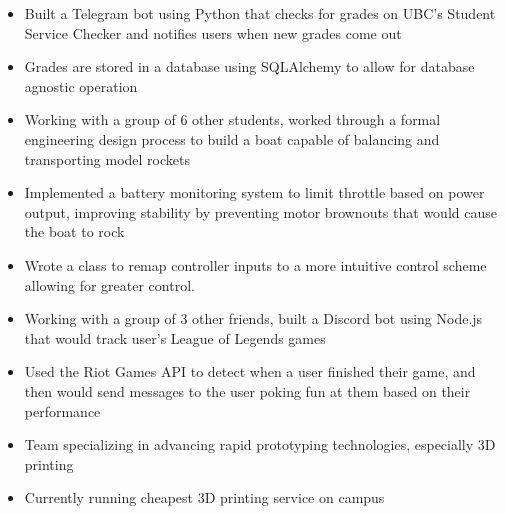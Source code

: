 \documentclass{resume}
\begin{document}
\begin{itemize}
	\item Built a Telegram bot using Python that checks for grades on UBC's Student Service Checker and notifies users when new grades come out
	\item Grades are stored in a database using SQLAlchemy to allow for database agnostic operation
\end{itemize}

\begin{itemize}
	\item Working with a group of 6 other students, worked through a formal engineering design process to build a boat capable of balancing and transporting model rockets
	\item Implemented a battery monitoring system to limit throttle based on power output, improving stability by preventing motor brownouts that would cause the boat to rock
	\item Wrote a class to remap controller inputs to a more intuitive control scheme allowing for greater control.
\end{itemize}

\begin{itemize}
	\item Working with a group of 3 other friends, built a Discord bot using Node.js that would track user's League of Legends games
	\item Used the Riot Games API to detect when a user finished their game, and then would send messages to the user poking fun at them based on their performance
\end{itemize}

\StudentTeams

\begin{itemize}
	\item Team specializing in advancing rapid prototyping technologies, especially 3D printing
	\item Currently running cheapest 3D printing service on campus
\end{itemize}

\OtherWorkExperience
\end{document}
